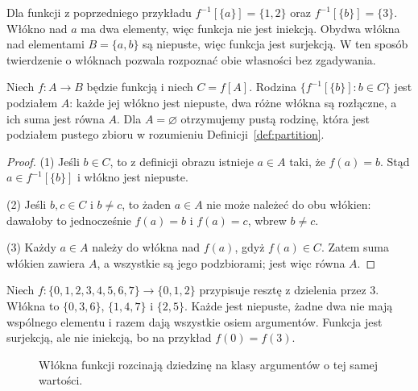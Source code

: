 \begin{przyklad}
Dla funkcji z poprzedniego przykładu
$f^{-1}[\{a\}]=\{1,2\}$ oraz $f^{-1}[\{b\}]=\{3\}$.
Włókno nad $a$ ma dwa elementy, więc funkcja nie jest iniekcją.
Obydwa włókna nad elementami $B=\{a,b\}$ są niepuste,
więc funkcja jest surjekcją. W ten sposób twierdzenie o włóknach
pozwala rozpoznać obie własności bez zgadywania.
\end{przyklad}


\begin{twierdzenie}\label{thm:fiber-partition-xliv}
Niech $f:A\to B$ będzie funkcją i niech $C=f[A]$. Rodzina
$\{f^{-1}[\{b\}]:b\in C\}$ jest podziałem $A$: każde jej włókno
jest niepuste, dwa różne włókna są rozłączne, a ich suma jest równa $A$.
Dla $A=\varnothing$ otrzymujemy pustą rodzinę, która jest podziałem
pustego zbioru w rozumieniu Definicji~\ref{def:partition}.
\end{twierdzenie}
\begin{proof}
(1) Jeśli $b\in C$, to z definicji obrazu istnieje $a\in A$
taki, że $f(a)=b$. Stąd $a\in f^{-1}[\{b\}]$ i włókno jest niepuste.

(2) Jeśli $b,c\in C$ i $b\ne c$, to żaden $a\in A$ nie może
należeć do obu włókien: dawałoby to jednocześnie $f(a)=b$ i $f(a)=c$,
wbrew $b\ne c$.

(3) Każdy $a\in A$ należy do włókna nad $f(a)$, gdyż
$f(a)\in C$. Zatem suma włókien zawiera $A$, a wszystkie są jego
podzbiorami; jest więc równa $A$.
\end{proof}
\begin{przyklad}
Niech $f:\{0,1,2,3,4,5,6,7\}\to\{0,1,2\}$ przypisuje resztę
z dzielenia przez $3$. Włókna to
$\{0,3,6\}$, $\{1,4,7\}$ i $\{2,5\}$.
Każde jest niepuste, żadne dwa nie mają wspólnego elementu i razem
dają wszystkie osiem argumentów. Funkcja jest surjekcją, ale nie
iniekcją, bo na przykład $f(0)=f(3)$.
\end{przyklad}

\begin{figure}[htbp]
\centering
{}
\caption{Włókna funkcji rozcinają dziedzinę na klasy argumentów o tej samej wartości.}
\label{fig:fiber-partition-xliv}
\end{figure}


